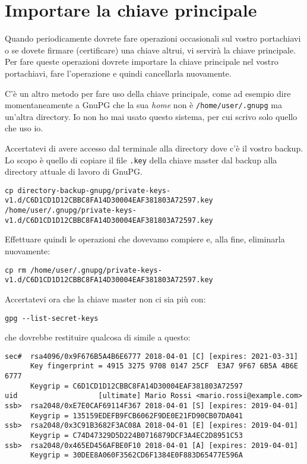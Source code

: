 \chapter{Importare la chiave principale} \label{importare-chiave}

Quando periodicamente dovrete fare operazioni occasionali sul vostro portachiavi
o se dovete firmare (certificare) una chiave altrui, vi servirà la chiave
principale. Per fare queste operazioni dovrete importare la chiave principale
nel vostro portachiavi, fare l'operazione e quindi cancellarla nuovamente.

C'è un altro metodo per fare uso della chiave principale, come ad esempio dire
momentaneamente a GnuPG che la sua \emph{home} non è \texttt{/home/user/.gnupg}
ma un'altra directory. Io non ho mai usato questo sistema, per cui scrivo solo
quello che uso io.

Accertatevi di avere accesso dal terminale alla directory dove c'è il vostro
backup. Lo scopo è quello di copiare il file \texttt{.key} della chiave master
dal backup alla directory attuale di lavoro di GnuPG.

\begin{lstlisting}
cp directory-backup-gnupg/private-keys-v1.d/C6D1CD1D12CBBC8FA14D30004EAF381803A72597.key /home/user/.gnupg/private-keys-v1.d/C6D1CD1D12CBBC8FA14D30004EAF381803A72597.key
\end{lstlisting}

Effettuare quindi le operazioni che dovevamo compiere e, alla fine, eliminarla
nuovamente:

\begin{lstlisting}
cp rm /home/user/.gnupg/private-keys-v1.d/C6D1CD1D12CBBC8FA14D30004EAF381803A72597.key
\end{lstlisting}

Accertatevi ora che la chiave master non ci sia più con:

\begin{lstlisting}
gpg --list-secret-keys
\end{lstlisting}

che dovrebbe restituire qualcosa di simile a questo:

\begin{lstlisting}
sec#  rsa4096/0x9F676B5A4B6E6777 2018-04-01 [C] [expires: 2021-03-31]
      Key fingerprint = 4915 3275 9708 0147 25CF  E3A7 9F67 6B5A 4B6E 6777
      Keygrip = C6D1CD1D12CBBC8FA14D30004EAF381803A72597
uid                   [ultimate] Mario Rossi <mario.rossi@example.com>
ssb>  rsa2048/0xE7E0CAF69114F367 2018-04-01 [S] [expires: 2019-04-01]
      Keygrip = 135159EDEFB9FCB6062F9DE0E21FD90CB07DA041
ssb>  rsa2048/0x3C91B3682F3AC08A 2018-04-01 [E] [expires: 2019-04-01]
      Keygrip = C74D47329D5D224B0716879DCF3A4EC2D8951C53
ssb>  rsa2048/0x465ED456AFBE0F10 2018-04-01 [A] [expires: 2019-04-01]
      Keygrip = 30DEE8A060F3562CD6F1384E0F883D65477E596A
\end{lstlisting}

